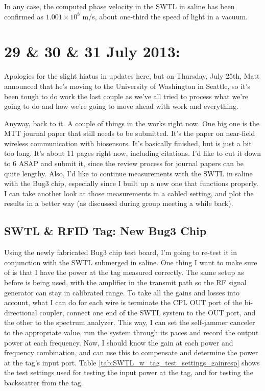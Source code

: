 \documentclass[12pt,onecolumn,titlepage]{article}
\begin{document}
In any case, the computed phase velocity in the SWTL in saline has been confirmed as $1.001 \times 10^8$ m/s, about one-third the speed of light in a vacuum. 




\clearpage
\section{29 \& 30 \& 31 July 2013:}

\indent \indent Apologies for the slight hiatus in updates here, but on Thursday, July 25th, Matt announced that he's moving to the University of Washington in Seattle, so it's been tough to do work the last couple as we've all tried to process what we're going to do and how we're going to move ahead with work and everything.

Anyway, back to it. A couple of things in the works right now. One big one is the MTT journal paper that still needs to be submitted. It's the paper on near-field wireless communication with biosensors. It's basically finished, but is just a bit too long. It's about 11 pages right now, including citations. I'd like to cut it down to 6 ASAP and submit it, since the review process for journal papers can be quite lengthy. Also, I'd like to continue measurements with the SWTL in saline with the Bug3 chip, especially since I built up a new one that functions properly. I can take another look at those measurements in a cabled setting, and plot the results in a better way (as discussed during group meeting a while back). 



\subsection{SWTL \& RFID Tag: New Bug3 Chip}
\indent \indent Using the newly fabricated Bug3 chip test board, I'm going to re-test it in conjunction with the SWTL submerged in saline. One thing I want to make sure of is that I have the power at the tag measured correctly. The same setup as before is being used, with the amplifier in the transmit path so the RF signal generator can stay in calibrated range. To take all the gains and losses into account, what I can do for each wire is terminate the CPL OUT port of the bi-directional coupler, connect one end of the SWTL system to the OUT port, and the other to the spectrum analyzer. This way, I can set the self-jammer canceler to the appropriate value, run the system through its paces and record the output power at each frequency. Now, I should know the gain at each power and frequency combination, and can use this to compensate and determine the power at the tag's input port. Table \ref{tab:SWTL_w_tag_test_settings_gainresp} shows the test settings used for testing the input power at the tag, and for testing the backscatter from the tag. 
\end{document}
